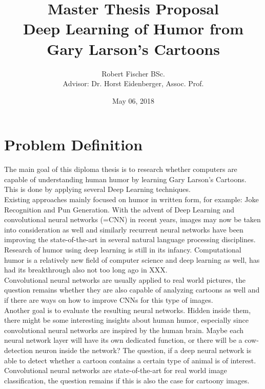 \documentclass[11pt]{article}
\title{\textbf{Master Thesis Proposal} \\
Deep Learning of Humor from Gary Larson's Cartoons}
\author{
Robert Fischer BSc. \\
Advisor: Dr. Horst Eidenberger, Assoc. Prof.}
\date{May 06, 2018}
\begin{document}
\maketitle

\pagebreak

\section{Problem Definition}

The main goal of this diploma thesis is to research whether computers are capable of understanding human humor by learning Gary Larson's Cartoons. This is done by applying several Deep Learning techniques. \\

Existing approaches mainly focused on humor in written form, for example: Joke Recognition and Pun Generation. With the advent of Deep Learning and convolutional neural networks (=CNN) in recent years, images may now be taken into consideration as well and similarly recurrent neural networks have been improving the state-of-the-art in several natural language processing disciplines. Research of humor using deep learning is still in its infancy. Computational humor is a relatively new field of computer science and deep learning as well, has had its breakthrough also not too long ago in XXX. \\

Convolutional neural networks are usually applied to real world pictures, the question remains whether they are also capable of analyzing cartoons as well and if there are ways on how to improve CNNs for this type of images.\\

Another goal is to evaluate the resulting neural networks. Hidden inside them, there might be some interesting insights about human humor, especially since convolutional neural networks are inspired by the human brain. Maybe each neural network layer will have its own dedicated function, or there will be a cow-detection neuron inside the network? The question, if a deep neural network is able to detect whether a cartoon contains a certain type of animal is of interest. Convolutional neural networks are state-of-the-art for real world image classification, the question remains if this is also the case for cartoony images.

\pagebreak
\end{document}
